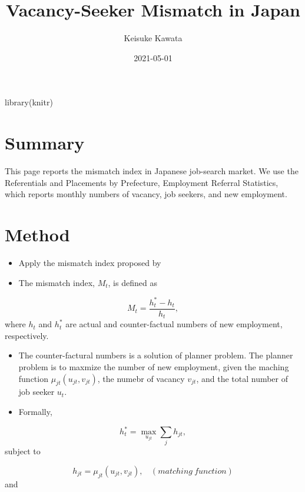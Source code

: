 \documentclass[
]{book}
\title{Vacancy-Seeker Mismatch in Japan}
\author{Keisuke Kawata}
\date{2021-05-01}
\newenvironment{Shaded}{\begin{snugshade}}{\end{snugshade}}
\newcommand{\FunctionTok}[1]{\textcolor[rgb]{0.00,0.00,0.00}{#1}}
\newcommand{\NormalTok}[1]{#1}
\begin{document}
\maketitle

{
\setcounter{tocdepth}{1}
\tableofcontents
}
\begin{Shaded}
\begin{Highlighting}[]
\FunctionTok{library}\NormalTok{(knitr)}
\end{Highlighting}
\end{Shaded}

\hypertarget{summary}{%
\chapter{Summary}\label{summary}}

This page reports the mismatch index \citep{csahin2014mismatch} in Japanese job-search market.
We use the Referentials and Placements by Prefecture, Employment Referral Statistics, which reports monthly numbers of vacancy, job seekers, and new employment.

\hypertarget{intro}{%
\chapter{Method}\label{intro}}

\begin{itemize}
\item
  Apply the mismatch index proposed by
\item
  The mismatch index, \(M_t\), is defined as
\end{itemize}

\[M_t = \frac{h_t^{*}-h_t}{h_t},\]
where \(h_t\) and \(h_t^*\) are actual and counter-factual numbers of new employment, respectively.

\begin{itemize}
\item
  The counter-factural numbers is a solution of planner problem.
  The planner problem is to maxmize the number of new employment, given the maching function \(\mu_{jt}(u_{jt},v_{jt})\), the numebr of vacancy \(v_{jt}\), and the total number of job seeker \(u_{t}\).
\item
  Formally,
\end{itemize}

\[h_t^*=\max_{u_{jt}} \sum_j h_{jt},\]
subject to

\[h_{jt}=\mu_{jt}(u_{jt},v_{jt}),\ \ \ \ (matching\ function)\]
and
\end{document}
